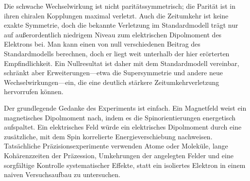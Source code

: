 \begin{classroomqa}\end{classroomqa}

\begin{classroomqa}\end{classroomqa}

Die schwache Wechselwirkung ist nicht paritätssymmetrisch; die Parität ist in ihren chiralen Kopplungen maximal verletzt. Auch die Zeitumkehr ist keine exakte Symmetrie, doch die bekannte Verletzung im Standardmodell trägt nur auf außerordentlich niedrigem Niveau zum elektrischen Dipolmoment des Elektrons bei. Man kann einen von null verschiedenen Beitrag des Standardmodells berechnen, doch er liegt weit unterhalb der hier erörterten Empfindlichkeit. Ein Nullresultat ist daher mit dem Standardmodell vereinbar, schränkt aber Erweiterungen---etwa die Supersymmetrie und andere neue Wechselwirkungen---ein, die eine deutlich stärkere Zeitumkehrverletzung hervorrufen können.

Der grundlegende Gedanke des Experiments ist einfach. Ein Magnetfeld weist ein magnetisches Dipolmoment nach, indem es die Spinorientierungen energetisch aufspaltet. Ein elektrisches Feld würde ein elektrisches Dipolmoment durch eine zusätzliche, mit dem Spin korrelierte Energieverschiebung nachweisen. Tatsächliche Präzisionsexperimente verwenden Atome oder Moleküle, lange Kohärenzzeiten der Präzession, Umkehrungen der angelegten Felder und eine sorgfältige Kontrolle systematischer Effekte, statt ein isoliertes Elektron in einem naiven Versuchsaufbau zu untersuchen.

